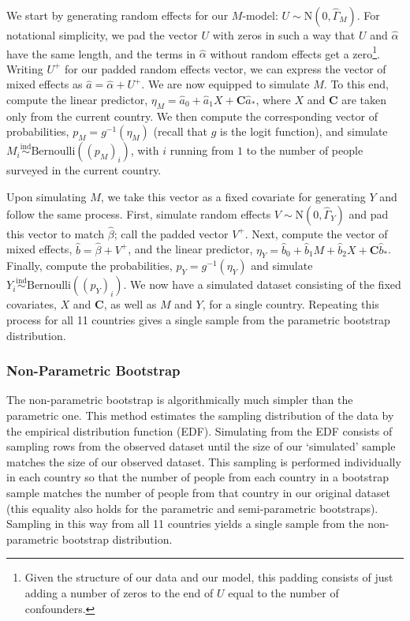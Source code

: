 \documentclass{article}
\newcommand{\C}{\mathbf{C}}
\begin{document}
We start by generating random effects for our $M$-model: $U \sim \mathrm{N}(0, \hat{\Gamma}_M)$. For notational simplicity, we pad the vector $U$ with zeros in such a way that $U$ and $\hat{\alpha}$ have the same length, and the terms in $\hat{\alpha}$ without random effects get a zero\footnote{Given the structure of our data and our model, this padding consists of just adding a number of zeros to the end of $U$ equal to the number of confounders.}. Writing $U^+$ for our padded random effects vector, we can express the vector of mixed effects as $\hat{a} = \hat{\alpha} + U^+$. We are now equipped to simulate $M$. To this end, compute the linear predictor, $\eta_M = \hat{a}_0 + \hat{a}_1 X + \C \hat{a}_*$, where $X$ and $\C$ are taken only from the current country. We then compute the corresponding vector of probabilities, $p_M = g^{-1}(\eta_M)$ (recall that $g$ is the logit function), and simulate $M_i \overset{\mathrm{ind}}{\sim} \mathrm{Bernoulli}((p_M)_i)$, with $i$ running from $1$ to the number of people surveyed in the current country.

Upon simulating $M$, we take this vector as a fixed covariate for generating $Y$ and follow the same process. First, simulate random effects $V \sim \mathrm{N}(0, \hat{\Gamma}_Y)$ and pad this vector to match $\hat{\beta}$; call the padded vector $V^+$. Next, compute the vector of mixed effects, $\hat{b} = \hat{\beta} + V^+$, and the linear predictor, $\eta_Y = \hat{b}_0 + \hat{b}_1 M + \hat{b}_2 X + \C \hat{b}_*$. Finally, compute the probabilities, $p_Y = g^{-1}(\eta_Y)$ and simulate $Y_i \overset{\mathrm{ind}}{\sim} \mathrm{Bernoulli}((p_Y)_i)$. We now have a simulated dataset consisting of the fixed covariates, $X$ and $\C$, as well as $M$ and $Y$, for a single country. Repeating this process for all 11 countries gives a single sample from the parametric bootstrap distribution.


\subsubsection{Non-Parametric Bootstrap}

The non-parametric bootstrap is algorithmically much simpler than the parametric one. This method estimates the sampling distribution of the data by the empirical distribution function (EDF). Simulating from the EDF consists of sampling rows from the observed dataset until the size of our `simulated' sample matches the size of our observed dataset. This sampling is performed individually in each country so that the number of people from each country in a bootstrap sample matches the number of people from that country in our original dataset (this equality also holds for the parametric and semi-parametric bootstraps). Sampling in this way from all 11 countries yields a single sample from the non-parametric bootstrap distribution.
\end{document}
